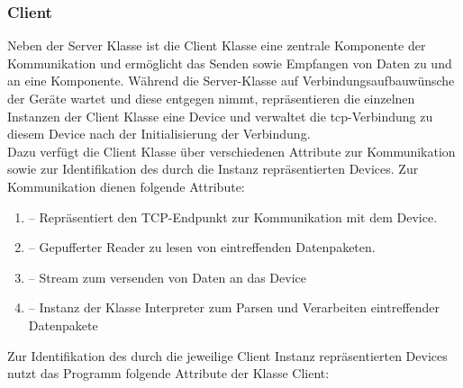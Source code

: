 \subsubsection{Client}
Neben der Server Klasse ist die Client Klasse eine zentrale Komponente der Kommunikation und ermöglicht das Senden sowie Empfangen von Daten zu und an eine Komponente.
Während die Server-Klasse auf Verbindungsaufbauwünsche der Geräte wartet und diese entgegen nimmt, 
repräsentieren die einzelnen Instanzen der Client Klasse eine Device und verwaltet die \gls{tcp}-Verbindung zu diesem Device nach der Initialisierung
der Verbindung. \\
Dazu verfügt die Client Klasse über verschiedenen Attribute zur Kommunikation sowie zur Identifikation des durch die Instanz repräsentierten
Devices. Zur Kommunikation dienen folgende Attribute:
\begin{enumerate}
	\item{} -- Repräsentiert den TCP-Endpunkt zur Kommunikation mit dem Device.
	\item{} -- Gepufferter Reader zu lesen von eintreffenden Datenpaketen.
	\item{} -- Stream zum versenden von Daten an das Device
	\item{} -- Instanz der Klasse Interpreter zum Parsen und Verarbeiten eintreffender Datenpakete
\end{enumerate}
Zur Identifikation des durch die jeweilige Client Instanz repräsentierten Devices nutzt das Programm folgende Attribute der Klasse Client:
